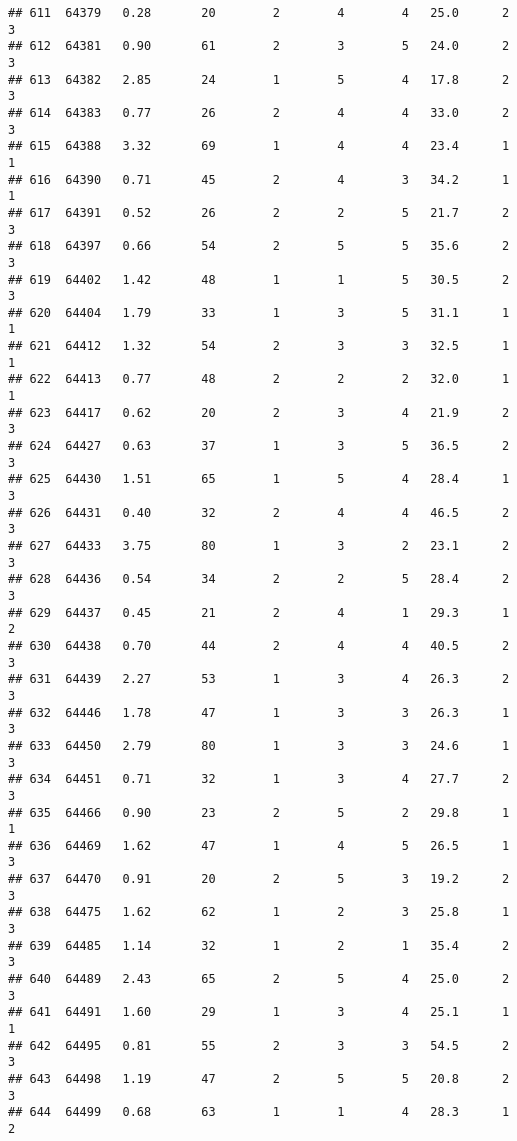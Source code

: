 \documentclass[
]{article}
\begin{document}
\begin{verbatim}
## 611  64379   0.28       20        2        4        4   25.0      2      3
## 612  64381   0.90       61        2        3        5   24.0      2      3
## 613  64382   2.85       24        1        5        4   17.8      2      3
## 614  64383   0.77       26        2        4        4   33.0      2      3
## 615  64388   3.32       69        1        4        4   23.4      1      1
## 616  64390   0.71       45        2        4        3   34.2      1      1
## 617  64391   0.52       26        2        2        5   21.7      2      3
## 618  64397   0.66       54        2        5        5   35.6      2      3
## 619  64402   1.42       48        1        1        5   30.5      2      3
## 620  64404   1.79       33        1        3        5   31.1      1      1
## 621  64412   1.32       54        2        3        3   32.5      1      1
## 622  64413   0.77       48        2        2        2   32.0      1      1
## 623  64417   0.62       20        2        3        4   21.9      2      3
## 624  64427   0.63       37        1        3        5   36.5      2      3
## 625  64430   1.51       65        1        5        4   28.4      1      3
## 626  64431   0.40       32        2        4        4   46.5      2      3
## 627  64433   3.75       80        1        3        2   23.1      2      3
## 628  64436   0.54       34        2        2        5   28.4      2      3
## 629  64437   0.45       21        2        4        1   29.3      1      2
## 630  64438   0.70       44        2        4        4   40.5      2      3
## 631  64439   2.27       53        1        3        4   26.3      2      3
## 632  64446   1.78       47        1        3        3   26.3      1      3
## 633  64450   2.79       80        1        3        3   24.6      1      3
## 634  64451   0.71       32        1        3        4   27.7      2      3
## 635  64466   0.90       23        2        5        2   29.8      1      1
## 636  64469   1.62       47        1        4        5   26.5      1      3
## 637  64470   0.91       20        2        5        3   19.2      2      3
## 638  64475   1.62       62        1        2        3   25.8      1      3
## 639  64485   1.14       32        1        2        1   35.4      2      3
## 640  64489   2.43       65        2        5        4   25.0      2      3
## 641  64491   1.60       29        1        3        4   25.1      1      1
## 642  64495   0.81       55        2        3        3   54.5      2      3
## 643  64498   1.19       47        2        5        5   20.8      2      3
## 644  64499   0.68       63        1        1        4   28.3      1      2

\end{verbatim}
\end{document}
